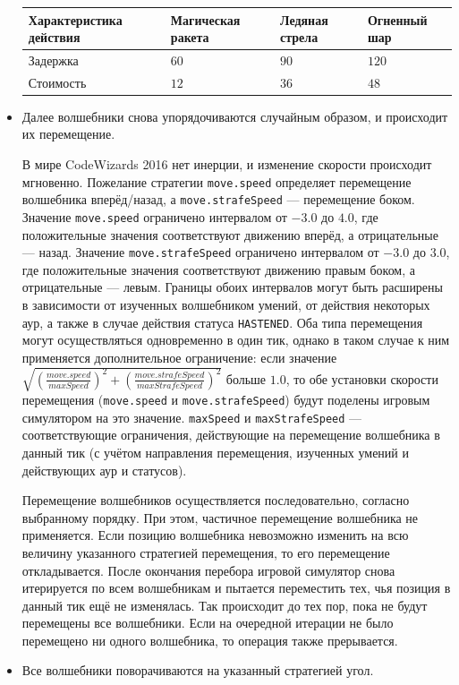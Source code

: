 \begin{itemize}
          \begin{tabular}{| l | l | l | l |}
              \hline
              Характеристика действия & Магическая ракета     & Ледяная стрела & Огненный шар \\
              \hline
              Задержка                & $60$\footnotemark[12] & $90$           & $120$        \\
              Стоимость               & $12$                  & $36$           & $48$         \\
              \hline
          \end{tabular}
    \item Далее волшебники снова упорядочиваются случайным образом, и происходит их перемещение.

          В мире CodeWizards 2016 нет инерции, и изменение скорости происходит мгновенно. Пожелание стратегии \texttt{move.speed} определяет
          перемещение волшебника вперёд/назад, а \texttt{move.strafeSpeed} --- перемещение боком. Значение \texttt{move.speed} ограничено
          интервалом от $-3.0$ до $4.0$, где положительные значения соответствуют движению вперёд, а отрицательные --- назад. Значение
          \texttt{move.strafeSpeed} ограничено интервалом от $-3.0$ до $3.0$, где положительные значения соответствуют движению правым
          боком, а отрицательные --- левым. Границы обоих интервалов могут быть расширены в зависимости от изученных волшебником умений, от
          действия некоторых аур, а также в случае действия статуса \texttt{HASTENED}. Оба типа перемещения могут осуществляться
          одновременно в один тик, однако в таком случае к ним применяется дополнительное ограничение: если значение
          \texttt{$\sqrt{(\frac{move.speed}{maxSpeed})^2 + (\frac{move.strafeSpeed}{maxStrafeSpeed})^2}$} больше $1.0$, то обе установки
          скорости перемещения (\texttt{move.speed} и \texttt{move.strafeSpeed}) будут поделены игровым симулятором на это значение.
          \texttt{maxSpeed} и \texttt{maxStrafeSpeed} --- соответствующие ограничения, действующие на перемещение волшебника в данный тик (с
          учётом направления перемещения, изученных умений и действующих аур и статусов).

          Перемещение волшебников осуществляется последовательно, согласно выбранному порядку. При этом, частичное перемещение волшебника не
          применяется. Если позицию волшебника невозможно изменить на всю величину указанного стратегией перемещения\footnotemark[13], то
          его перемещение откладывается. После окончания перебора игровой симулятор снова итерируется по всем волшебникам и пытается
          переместить тех, чья позиция в данный тик ещё не изменялась. Так происходит до тех пор, пока не будут перемещены все волшебники.
          Если на очередной итерации не было перемещено ни одного волшебника, то операция также прерывается.

    \item Все волшебники поворачиваются на указанный стратегией угол.
\end{itemize}

